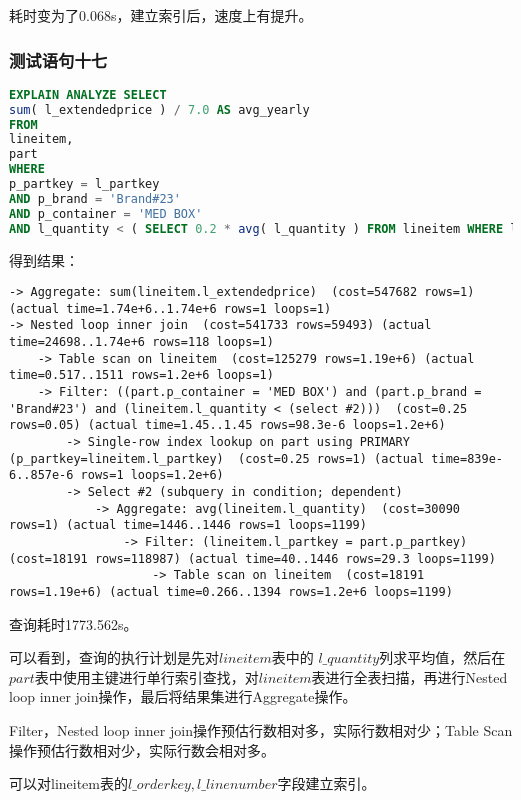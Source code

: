 \documentclass{article}
\begin{document}
耗时变为了0.068s，建立索引后，速度上有提升。

\subsubsection{测试语句十七}

\begin{lstlisting}[language=sql]
EXPLAIN ANALYZE SELECT
sum( l_extendedprice ) / 7.0 AS avg_yearly 
FROM
lineitem,
part 
WHERE
p_partkey = l_partkey 
AND p_brand = 'Brand#23' 
AND p_container = 'MED BOX' 
AND l_quantity < ( SELECT 0.2 * avg( l_quantity ) FROM lineitem WHERE l_partkey = p_partkey );
\end{lstlisting}

得到结果：

\begin{lstlisting}
-> Aggregate: sum(lineitem.l_extendedprice)  (cost=547682 rows=1) (actual time=1.74e+6..1.74e+6 rows=1 loops=1)
-> Nested loop inner join  (cost=541733 rows=59493) (actual time=24698..1.74e+6 rows=118 loops=1)
    -> Table scan on lineitem  (cost=125279 rows=1.19e+6) (actual time=0.517..1511 rows=1.2e+6 loops=1)
    -> Filter: ((part.p_container = 'MED BOX') and (part.p_brand = 'Brand#23') and (lineitem.l_quantity < (select #2)))  (cost=0.25 rows=0.05) (actual time=1.45..1.45 rows=98.3e-6 loops=1.2e+6)
        -> Single-row index lookup on part using PRIMARY (p_partkey=lineitem.l_partkey)  (cost=0.25 rows=1) (actual time=839e-6..857e-6 rows=1 loops=1.2e+6)
        -> Select #2 (subquery in condition; dependent)
            -> Aggregate: avg(lineitem.l_quantity)  (cost=30090 rows=1) (actual time=1446..1446 rows=1 loops=1199)
                -> Filter: (lineitem.l_partkey = part.p_partkey)  (cost=18191 rows=118987) (actual time=40..1446 rows=29.3 loops=1199)
                    -> Table scan on lineitem  (cost=18191 rows=1.19e+6) (actual time=0.266..1394 rows=1.2e+6 loops=1199)
\end{lstlisting}

查询耗时1773.562s。

可以看到，查询的执行计划是先对$lineitem$表中的 $l\_quantity$列求平均值，然后在$part$表中使用主键进行单行索引查找，对$lineitem$表进行全表扫描，再进行Nested loop inner join操作，最后将结果集进行Aggregate操作。

Filter，Nested loop inner join操作预估行数相对多，实际行数相对少；Table Scan操作预估行数相对少，实际行数会相对多。

可以对lineitem表的$l\_orderkey,l\_linenumber$字段建立索引。
\end{document}
